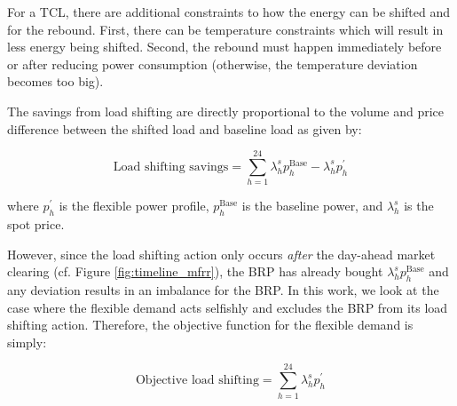 For a TCL, there are additional constraints to how the energy can be shifted and for the rebound. First, there can be temperature constraints which will result in less energy being shifted. Second, the rebound must happen immediately before or after reducing power consumption (otherwise, the temperature deviation becomes too big).

The savings from load shifting are directly proportional to the volume and price difference between the shifted load and baseline load as given by:

\begin{equation}\label{eq:load_shifting_savings}
    \text{Load shifting savings} = \sum_{h=1}^{24} \lambda^{s}_{h} p^{\text{Base}}_{h} - \lambda^{s}_{h} p^{\prime}_{h}
\end{equation}

where $p^{\prime}_{h}$ is the flexible power profile, $p^{\text{Base}}_{h}$ is the baseline power, and $\lambda^{s}_{h}$ is the spot price.

However, since the load shifting action only occurs \textit{after} the day-ahead market clearing (cf. Figure \ref{fig:timeline_mfrr}), the BRP has already bought $\lambda^{s}_{h} p^{\text{Base}}_{h}$ and any deviation results in an imbalance for the BRP. In this work, we look at the case where the flexible demand acts selfishly and excludes the BRP from its load shifting action. Therefore, the objective function for the flexible demand is simply:

\begin{equation}\label{eq:LoadShiftingObjective}
    \text{Objective load shifting} = \sum_{h=1}^{24} \lambda_{h}^{s} p_{h}^{\prime}
\end{equation}
